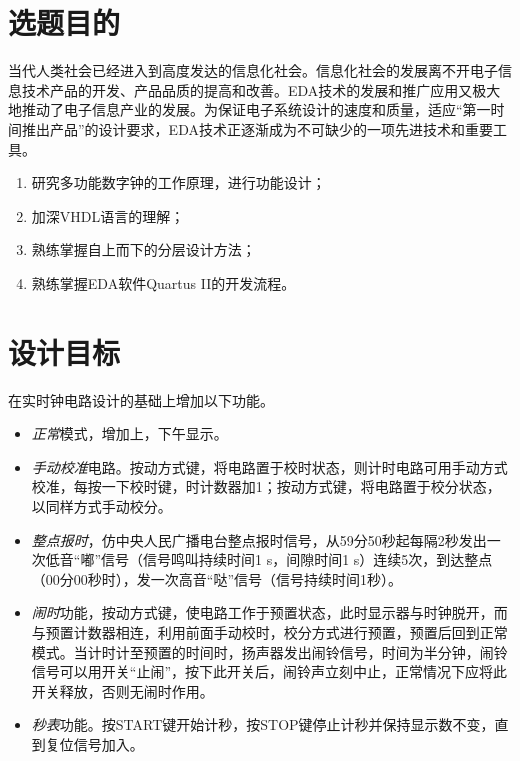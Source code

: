 \documentclass[12pt,AutoFakeBold]{article}
\begin{document}
\maketitle
\setcounter{tocdepth}{2}
\tableofcontents  %


\makeatletter
\begin{center}
    \LARGE \textbf{\textsf{\@problem}}
\end{center}
\makeatother


\section{选题目的}
当代人类社会已经进入到高度发达的信息化社会。信息化社会的发展离不开电子信息技术产品的开发、产品品质的提高和改善。EDA技术的发展和推广应用又极大地推动了电子信息产业的发展。为保证电子系统设计的速度和质量，适应“第一时间推出产品”的设计要求，EDA技术正逐渐成为不可缺少的一项先进技术和重要工具。

\begin{enumerate}
    \item 研究多功能数字钟的工作原理，进行功能设计；
    \item 加深VHDL语言的理解；
    \item 熟练掌握自上而下的分层设计方法；
    \item 熟练掌握EDA软件Quartus II的开发流程。
\end{enumerate}


\section{设计目标}
在实时钟电路设计的基础上增加以下功能。

\begin{itemize}
    \item \textit{正常}模式，增加上，下午显示。
    \item \textit{手动校准}电路。按动方式键，将电路置于校时状态，则计时电路可用手动方式校准，每按一下校时键，时计数器加1；按动方式键，将电路置于校分状态，以同样方式手动校分。
    \item \textit{整点报时}，仿中央人民广播电台整点报时信号，从59分50秒起每隔2秒发出一次低音“嘟”信号（信号鸣叫持续时间1 s，间隙时间1 s）连续5次，到达整点（00分00秒时），发一次高音“哒”信号（信号持续时间1秒）。
    \item \textit{闹时}功能，按动方式键，使电路工作于预置状态，此时显示器与时钟脱开，而与预置计数器相连，利用前面手动校时，校分方式进行预置，预置后回到正常模式。当计时计至预置的时间时，扬声器发出闹铃信号，时间为半分钟，闹铃信号可以用开关“止闹”，按下此开关后，闹铃声立刻中止，正常情况下应将此开关释放，否则无闹时作用。
    \item \textit{秒表}功能。按START键开始计秒，按STOP键停止计秒并保持显示数不变，直到复位信号加入。 
\end{itemize}
 
\end{document}
